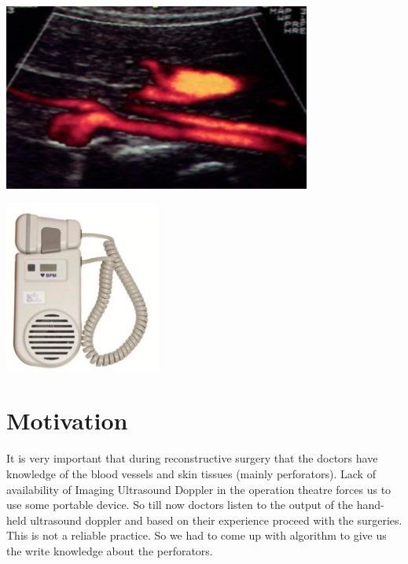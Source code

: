 \documentclass[BTech]{nitkdiss}
\begin{document}
\begin{center}
\includegraphics[scale = 0.6]{Colour_Doppler.png}
\end{center}


\begin{center}
\includegraphics[scale = 0.7]{H_Doppler.png}
\end{center}




\section{Motivation}
\hspace{0.4cm} It is very important that during reconstructive surgery that the doctors have knowledge of the blood vessels and skin tissues (mainly perforators). Lack of availability of Imaging Ultrasound Doppler in the operation theatre forces us to use some portable device. So till now doctors listen to the output of the hand-held ultrasound doppler and based on their experience proceed with the surgeries. This is not a reliable practice. So we had to come up with algorithm to give us the write knowledge about the perforators. 
\end{document}
